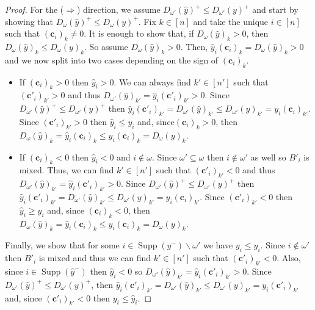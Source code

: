 \documentclass[a4paper, 12pt]{article}
\theoremstyle{plain}
\theoremstyle{definition}
\theoremstyle{remark}
\begin{document}
\begin{proof}
    For the ($\Rightarrow$) direction, we assume $D_{\omega'}(\hat y)^+ \le D_{\omega'}(y)^+$ and start by showing that $D_{\omega}(\hat y)^+ \le D_{\omega}(y)^+$. Fix $k \in [n]$ and take the unique $i \in [n]$ such that $(\mathbf{c}_i)_k \neq 0$. It is enough to show that, if $D_{\omega}(\hat y)_k>0$, then $D_{\omega}(\hat y)_k \le D_{\omega}(y)_k$. So assume $D_{\omega}(\hat y)_k>0$. Then, $\hat y_i(\mathbf{c}_i)_k=D_{\omega}(\hat y)_k>0$ and we now split into two cases depending on the sign of $(\mathbf{c}_i)_k$.
    \begin{itemize}
        \item If $(\mathbf{c}_i)_k>0$ then $\hat y_i>0$. We can always find $k' \in [n']$ such that $(\mathbf{c}'_i)_{k'}>0$ and thus $D_{\omega'}(\hat y)_{k'}=\hat y_i ( \mathbf{c}'_i)_{k'}>0$. Since $D_{\omega'}(\hat y)^+ \le D_{\omega'}(y)^+$ then $\hat y_i(\mathbf{c}'_i)_{k'}=D_{\omega'}(\hat y)_{k'} \le D_{\omega'}(y)_{k'}=y_i (\mathbf{c}_i)_{k'}$. Since $(\mathbf{c}'_i)_{k'}>0$ then $\hat y_i \le y_i$ and, since$(\mathbf{c}_i)_k>0$, then $D_{\omega}(\hat y)_k=\hat y_i (\mathbf{c}_i)_k \le y_i (\mathbf{c}_i)_k= D_{\omega}(y)_k$.
        \item If $(\mathbf{c}_i)_k<0$ then $\hat y_i<0$ and $i \not \in \omega$. Since $\omega' \subseteq \omega$ then $i \not\in \omega'$ as well so $B'_i$ is mixed. Thus, we can find $k' \in [n']$ such that $(\mathbf{c}'_i)_{k'}<0$ and thus $D_{\omega'}(\hat y)_{k'}=\hat y_i ( \mathbf{c}'_i)_{k'}>0$. Since $D_{\omega'}(\hat y)^+ \le D_{\omega'}(y)^+$ then $\hat y_i(\mathbf{c}'_i)_{k'}=D_{\omega'}(\hat y)_{k'} \le D_{\omega'}(y)_{k'}=y_i (\mathbf{c}_i)_{k'}$. Since $(\mathbf{c}'_i)_{k'}<0$ then $\hat y_i \ge y_i$ and, since $(\mathbf{c}_i)_k<0$, then $D_{\omega}(\hat y)_k=\hat y_i (\mathbf{c}_i)_k \le y_i (\mathbf{c}_i)_k= D_{\omega}(y)_k$.
    \end{itemize}

Finally, we show that for some $ i \in \operatorname{Supp}(\hat y^-) \backslash \omega'$ we have $y_i \le \hat y_i$. Since $i \not\in \omega'$ then $B'_i$ is mixed and thus we can find $k' \in [n']$ such that $(\mathbf{c}'_i)_{k'}<0$. Also, since $i \in \operatorname{Supp}(\hat y^-)$ then $\hat y_i<0$ so $D_{\omega'}(\hat y)_{k'}=\hat y_i (\mathbf{c}'_i)_{k'}>0$. Since $D_{\omega'}(\hat y)^+ \le D_{\omega'}(y)^+$, then $\hat y_i(\mathbf{c}'_i)_{k'}=D_{\omega'}(\hat y)_{k'} \le D_{\omega'}(y)_{k'}=y_i (\mathbf{c}'_i)_{k'}$ and, since $(\mathbf{c}'_i)_{k'}<0$ then $y_i \le \hat y_i$.


\end{proof}
\end{document}
